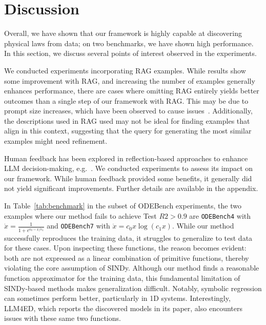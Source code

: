 \documentclass{article}
\begin{document}



\section{Discussion}

Overall, we have shown that our framework is highly capable at discovering physical laws from data; on two benchmarks, we have shown high performance.
In this section, we discuss several points of interest observed in the experiments. 

We conducted experiments incorporating RAG examples. 
While results show some improvement with RAG, and increasing the number of examples generally enhances performance, there are cases where omitting RAG entirely yields better outcomes than a single step of our framework with RAG. 
This may be due to prompt size increases, which have been observed to cause issues~\cite{fountas2024}. 
Additionally, the descriptions used in RAG used may not be ideal for finding examples that align in this context, suggesting that the query for generating the most similar examples might need refinement.

Human feedback has been explored in reflection-based approaches to enhance LLM decision-making, e.g.~\cite{ma2023eureka}. 
We conducted experiments to assess its impact on our framework. 
While human feedback provided some benefits, it generally did not yield significant improvements. 
Further details are available in the appendix.

In Table~\ref{tab:benchmark} in the subset of ODEBench experiments, the two examples where our method fails to achieve Test $R2 > 0.9$ are \texttt{ODEBench4} with $\dot{x} = \frac{1}{1 + e^{c_0 - x / c_1}}$ and \texttt{ODEBench7} with $\dot{x} = c_0x\log(c_1x)$. 
While our method successfully reproduces the training data, it struggles to generalize to test data for these cases. 
Upon inspecting these functions, the reason becomes evident: both are not expressed as a linear combination of primitive functions, thereby violating the core assumption of SINDy. 
Although our method finds a reasonable function approximator for the training data, this fundamental limitation of SINDy-based methods makes generalization difficult. 
Notably, symbolic regression can sometimes perform better, particularly in 1D systems. 
Interestingly, LLM4ED, which reports the discovered models in its paper, also encounters issues with these same two functions.
\end{document}
